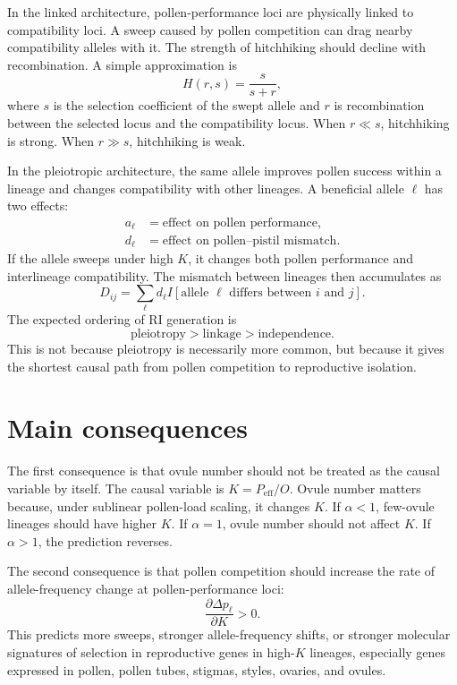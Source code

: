 \documentclass[11pt]{article}
\newcommand{\Peff}{P_{\mathrm{eff}}}
\begin{document}
In the linked architecture, pollen-performance loci are physically linked to compatibility loci. A sweep caused by pollen competition can drag nearby compatibility alleles with it. The strength of hitchhiking should decline with recombination. A simple approximation is
\begin{equation}
H(r,s)=\frac{s}{s+r},
\label{eq:hitchhiking}
\end{equation}
where \(s\) is the selection coefficient of the swept allele and \(r\) is recombination between the selected locus and the compatibility locus. When \(r\ll s\), hitchhiking is strong. When \(r\gg s\), hitchhiking is weak.

In the pleiotropic architecture, the same allele improves pollen success within a lineage and changes compatibility with other lineages. A beneficial allele \(\ell\) has two effects:
\begin{align}
a_\ell &= \text{effect on pollen performance},\\
d_\ell &= \text{effect on pollen--pistil mismatch}.
\end{align}
If the allele sweeps under high \(K\), it changes both pollen performance and interlineage compatibility. The mismatch between lineages then accumulates as
\begin{equation}
D_{ij}=\sum_\ell d_\ell I\left[\text{allele }\ell\text{ differs between }i\text{ and }j\right].
\end{equation}
The expected ordering of RI generation is
\begin{equation}
\text{pleiotropy} > \text{linkage} > \text{independence}.
\end{equation}
This is not because pleiotropy is necessarily more common, but because it gives the shortest causal path from pollen competition to reproductive isolation.

\section{Main consequences}

The first consequence is that ovule number should not be treated as the causal variable by itself. The causal variable is \(K=\Peff/O\). Ovule number matters because, under sublinear pollen-load scaling, it changes \(K\). If \(\alpha<1\), few-ovule lineages should have higher \(K\). If \(\alpha=1\), ovule number should not affect \(K\). If \(\alpha>1\), the prediction reverses.

The second consequence is that pollen competition should increase the rate of allele-frequency change at pollen-performance loci:
\begin{equation}
\frac{\partial \Delta p_\ell}{\partial K}>0.
\end{equation}
This predicts more sweeps, stronger allele-frequency shifts, or stronger molecular signatures of selection in reproductive genes in high-\(K\) lineages, especially genes expressed in pollen, pollen tubes, stigmas, styles, ovaries, and ovules.
\end{document}
